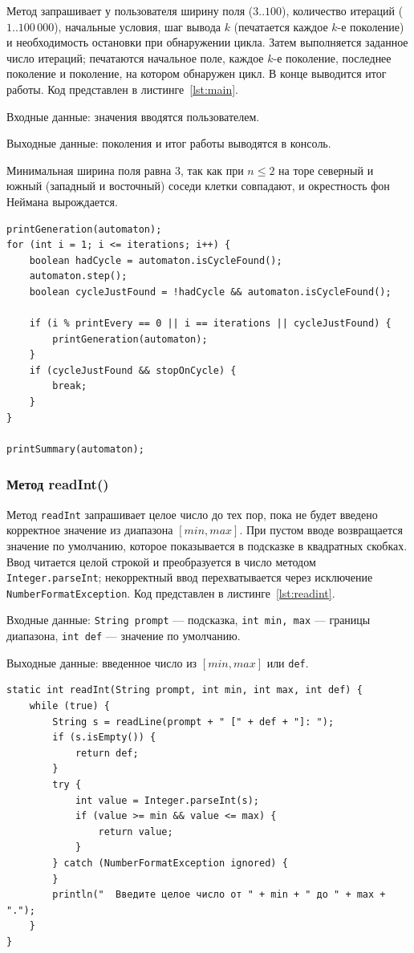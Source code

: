 \documentclass[a4paper,14pt]{extarticle}
\begin{document}
Метод запрашивает у пользователя ширину поля ($3..100$), количество итераций ($1..100\,000$), начальные условия, шаг вывода $k$ (печатается каждое $k$-е поколение) и необходимость остановки при обнаружении цикла. Затем выполняется заданное число итераций; печатаются начальное поле, каждое $k$-е поколение, последнее поколение и поколение, на котором обнаружен цикл. В конце выводится итог работы. Код представлен в листинге~\ref{lst:main}.

Входные данные: значения вводятся пользователем.

Выходные данные: поколения и итог работы выводятся в консоль.

Минимальная ширина поля равна 3, так как при $n \le 2$ на торе северный и южный (западный и восточный) соседи клетки совпадают, и окрестность фон Неймана вырождается.

\begin{lstlisting}[caption={Основной цикл метода main()}, label={lst:main}]
printGeneration(automaton);
for (int i = 1; i <= iterations; i++) {
	boolean hadCycle = automaton.isCycleFound();
	automaton.step();
	boolean cycleJustFound = !hadCycle && automaton.isCycleFound();

	if (i % printEvery == 0 || i == iterations || cycleJustFound) {
		printGeneration(automaton);
	}
	if (cycleJustFound && stopOnCycle) {
		break;
	}
}

printSummary(automaton);
\end{lstlisting}

\subsubsection*{Метод readInt()}

Метод \texttt{readInt} запрашивает целое число до тех пор, пока не будет введено корректное значение из диапазона $[min, max]$. При пустом вводе возвращается значение по умолчанию, которое показывается в подсказке в квадратных скобках. Ввод читается целой строкой и преобразуется в число методом \texttt{Integer.parseInt}; некорректный ввод перехватывается через исключение \texttt{NumberFormatException}. Код представлен в листинге~\ref{lst:readint}.

Входные данные: \texttt{String prompt} --- подсказка, \texttt{int min, max} --- границы диапазона, \texttt{int def} --- значение по умолчанию.

Выходные данные: введенное число из $[min, max]$ или \texttt{def}.

\begin{lstlisting}[caption={Метод readInt()}, label={lst:readint}]
static int readInt(String prompt, int min, int max, int def) {
	while (true) {
		String s = readLine(prompt + " [" + def + "]: ");
		if (s.isEmpty()) {
			return def;
		}
		try {
			int value = Integer.parseInt(s);
			if (value >= min && value <= max) {
				return value;
			}
		} catch (NumberFormatException ignored) {
		}
		println("  Введите целое число от " + min + " до " + max + ".");
	}
}
\end{lstlisting}
\end{document}
